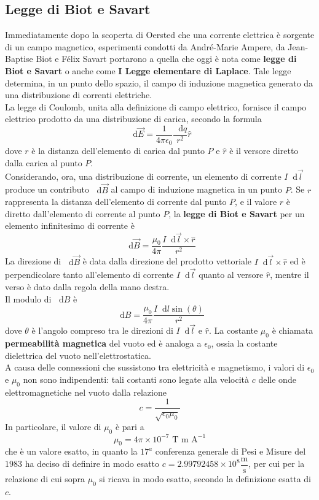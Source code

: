 \documentclass[a4paper]{extarticle}
\newcommand\dif{\mathop{}\!\mathrm{d}}
\begin{document}
\vspace{1em}
\subsection{Legge di Biot e Savart}
Immediatamente dopo la scoperta di Oersted che una corrente elettrica è sorgente di un campo magnetico, esperimenti condotti da André-Marie Ampere, da Jean-Baptise Biot e Félix Savart portarono a quella che oggi è nota come \textbf{legge di Biot e Savart} o anche come \textbf{I Legge elementare di Laplace}. Tale legge determina, in un punto dello spazio, il campo di induzione magnetica generato da una distribuzione di correnti elettriche.\\
La legge di Coulomb, unita alla definizione di campo elettrico, fornisce il campo elettrico prodotto da una distribuzione di carica, secondo la formula
\[\dif \vec E = \dfrac{1}{4 \pi \epsilon_0} \dfrac{\dif q}{r^2} \hat r\]
dove $r$ è la distanza dell'elemento di carica dal punto $P$ e $\hat r$ è il versore diretto dalla carica al punto $P$.\\
Considerando, ora, una distribuzione di corrente, un elemento di corrente $I \dif \vec l$ produce un contributo $\dif \vec B$ al campo di induzione magnetica in un punto $P$. Se $r$ rappresenta la distanza dell'elemento di corrente dal punto $P$, e il valore $\hat r$ è diretto dall'elemento di corrente al punto $P$, la \textbf{legge di Biot e Savart} per un elemento infinitesimo di corrente è
\[\boxed{\dif \vec B = \dfrac{\mu_0}{4 \pi} \dfrac{I \dif \vec l \times \hat r}{r^2}}\]
La direzione di $\dif \vec B$ è data dalla direzione del prodotto vettoriale $I \dif \vec l \times \hat r$ ed è perpendicolare tanto all'elemento di corrente $I \dif \vec l$ quanto al versore $\hat r$, mentre il verso è dato dalla regola della mano destra.\\
Il modulo di $\dif B$ è
\[\dif B = \dfrac{\mu_0}{4\pi} \dfrac{I \dif l \sin(\theta)}{r^2}\]
dove $\theta$ è l'angolo compreso tra le direzioni di $I \dif \vec l$ e $\hat r$. La costante $\mu_0$ è chiamata \textbf{permeabilità magnetica} del vuoto ed è analoga a $\epsilon_0$, ossia la costante dielettrica del vuoto nell'elettrostatica.\\
A causa delle connessioni che sussistono tra elettricità e magnetismo, i valori di $\epsilon_0$ e $\mu_0$ non sono indipendenti: tali costanti sono legate alla velocità $c$ delle onde elettromagnetiche nel vuoto dalla relazione
\[c=\dfrac{1}{\sqrt{\epsilon_0 \mu_0}}\]
In particolare, il valore di $\mu_0$ è pari a
\[\mu_0 = 4 \pi \times 10^{-7} \text{ T m A}^{-1}\]
che è un valore esatto, in quanto la $17^a$ conferenza generale di Pesi e Misure del $1983$ ha deciso di definire in modo esatto $c=2.99792458 \times 10^8 \dfrac{\text{m}}{\text{s}}$, per cui per la relazione di cui sopra $\mu_0$ si ricava in modo esatto, secondo la definizione esatta di $c$.
\end{document}
